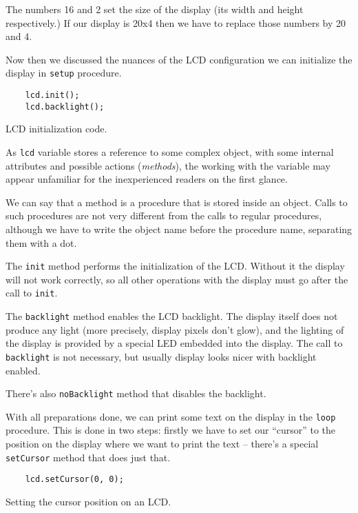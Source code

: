 \documentclass[../sparc.tex]{subfiles}
\begin{document}
The numbers 16 and 2 set the size of the display (its width and height
respectively.)  If our display is 20x4 then we have to replace those numbers by
20 and 4.

Now then we discussed the nuances of the LCD configuration we can initialize the
display in \texttt{setup} procedure.

\begin{listing}[ht]
  \begin{verbatim}
    lcd.init();
    lcd.backlight();
  \end{verbatim}
  \caption{LCD initialization code.}
  \label{listing:game-dev-lcd-init}
\end{listing}

As \texttt{lcd} variable stores a reference to some complex object,
with some internal attributes and possible actions (\emph{methods}), the working
with the variable may appear unfamiliar for the inexperienced readers on the
first glance.

We can say that a \gls{method} is a procedure that is stored inside an object.
Calls to such procedures are not very different from the calls to regular
procedures, although we have to write the object name before the procedure name,
separating them with a dot.

The \texttt{init} method performs the initialization of the LCD.
Without it the display will not work correctly, so all other operations with the
display must go after the call to \texttt{init}.

The \texttt{backlight} method enables the LCD backlight.  The display
itself does not produce any light (more precisely, display pixels don't glow),
and the lighting of the display is provided by a special LED embedded into the
display.  The call to \texttt{backlight} is not necessary, but usually
display looks nicer with backlight enabled.

There's also \texttt{noBacklight} method that disables the backlight.

With all preparations done, we can print some text on the display in the
\texttt{loop} procedure.  This is done in two steps: firstly we have to
set our ``cursor'' to the position on the display where we want to print the
text -- there's a special \texttt{setCursor} method that does just that.

\begin{listing}[ht]
  \begin{verbatim}
    lcd.setCursor(0, 0);
  \end{verbatim}
  \caption{Setting the cursor position on an LCD.}
  \label{listing:game-dev-lcd-set-cursor}
\end{listing}
\end{document}
